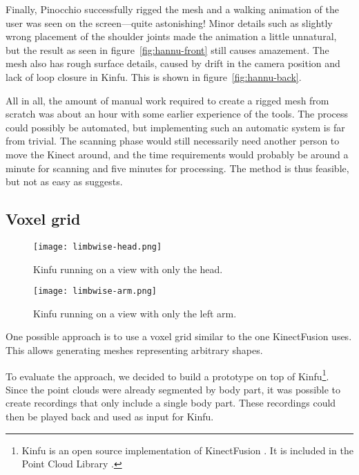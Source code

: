 Finally, Pinocchio successfully rigged the mesh and a walking animation of the user was seen on the screen---quite astonishing! Minor details such as slightly wrong placement of the shoulder joints made the animation a little unnatural, but the result as seen in figure~\ref{fig:hannu-front} still causes amazement. The mesh also has rough surface details, caused by drift in the camera position and lack of loop closure in Kinfu. This is shown in figure~\ref{fig:hannu-back}.

All in all, the amount of manual work required to create a rigged mesh from scratch was about an hour with some earlier experience of the tools. The process could possibly be automated, but implementing such an automatic system is far from trivial. The scanning phase would still necessarily need another person to move the Kinect around, and the time requirements would probably be around a minute for scanning and five minutes for processing. The method is thus feasible, but not as easy as \citet{charpentier2011accurate} suggests.

\subsection{Voxel grid} \label{voxelgrid}

\begin{figure}
    \centering
    \texttt{[image: limbwise-head.png]}
    \caption{Kinfu running on a view with only the head.}
    \label{fig:limbwise-head}
\end{figure}

\begin{figure}
    \centering
    \texttt{[image: limbwise-arm.png]}
    \caption{Kinfu running on a view with only the left arm.}
    \label{fig:limbwise-arm}
\end{figure}

One possible approach is to use a voxel grid similar to the one KinectFusion \autocites{newcombe2011kinectfusion}{izadi2011kinectfusion} uses. This allows generating meshes representing arbitrary shapes.

To evaluate the approach, we decided to build a prototype on top of Kinfu\footnote{Kinfu is an open source implementation of KinectFusion \citep{newcombe2011kinectfusion}. It is included in the Point Cloud Library \citep{PCL}.}. Since the point clouds were already segmented by body part, it was possible to create recordings that only include a single body part. These recordings could then be played back and used as input for Kinfu.

